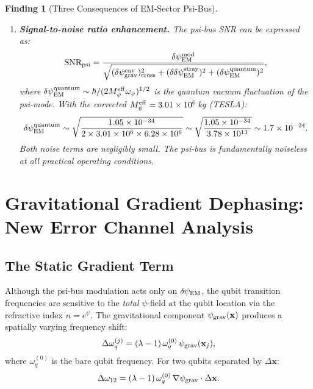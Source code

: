 \documentclass[11pt]{article}
\newtheorem{finding}[theorem]{Finding}
\theoremstyle{definition}
\theoremstyle{remark}
\newcommand{\ee}[1]{\times 10^{#1}}
\newcommand{\Meff}{M_\psi^{\rm eff}}
\newcommand{\psigrav}{\psi_{\rm grav}}
\newcommand{\dpsiEM}{\delta\psi_{\rm EM}}
\begin{document}
\begin{finding}[Three Consequences of EM-Sector Psi-Bus]
\begin{enumerate}
  \item \textbf{Signal-to-noise ratio enhancement.}
    The psi-bus SNR can be expressed as:
    \begin{equation}
      \text{SNR}_{\rm psi} = \frac{\dpsiEM^{\rm mod}}
      {\sqrt{(\delta\psigrav^{\rm env})^2_{\rm cross}
      + (\delta\dpsiEM^{\rm stray})^2 + (\dpsiEM^{\rm quantum})^2}},
    \end{equation}
    where $\dpsiEM^{\rm quantum} \sim \hbar/(2\Meff\omega_\psi)^{1/2}$
    is the quantum vacuum fluctuation of the psi-mode.  With the
    corrected $\Meff = 3.01\ee{6}$\,kg (TESLA):
    \begin{equation}
      \dpsiEM^{\rm quantum} \sim \sqrt{\frac{1.05\ee{-34}}
      {2\times 3.01\ee{6}\times 6.28\ee{6}}}
      \sim \sqrt{\frac{1.05\ee{-34}}{3.78\ee{13}}}
      \sim 1.7\ee{-24}.
    \end{equation}
    Both noise terms are negligibly small.  The psi-bus is fundamentally
    \emph{noiseless} at all practical operating conditions.
\end{enumerate}
\end{finding}

\section{Gravitational Gradient Dephasing: New Error Channel Analysis}
\label{sec:grav-gradient}

\subsection{The Static Gradient Term}
\label{sec:static-gradient}

Although the psi-bus modulation acts only on $\dpsiEM$, the qubit
transition frequencies are sensitive to the \emph{total} $\psi$-field
at the qubit location via the refractive index $n = e^\psi$.  The
gravitational component $\psigrav(\mathbf{x})$ produces a spatially
varying frequency shift:
\begin{equation}
  \Delta\omega_q^{(j)} = (\lambda-1)\,\omega_q^{(0)}\,
  \psigrav(\mathbf{x}_j),
  \label{eq:grav-freq-shift}
\end{equation}
where $\omega_q^{(0)}$ is the bare qubit frequency.  For two qubits
separated by $\Delta\mathbf{x}$:
\begin{equation}
  \Delta\omega_{12} = (\lambda-1)\,\omega_q^{(0)}\,
  \nabla\psigrav\cdot\Delta\mathbf{x}.
  \label{eq:differential-shift}
\end{equation}
\end{document}
